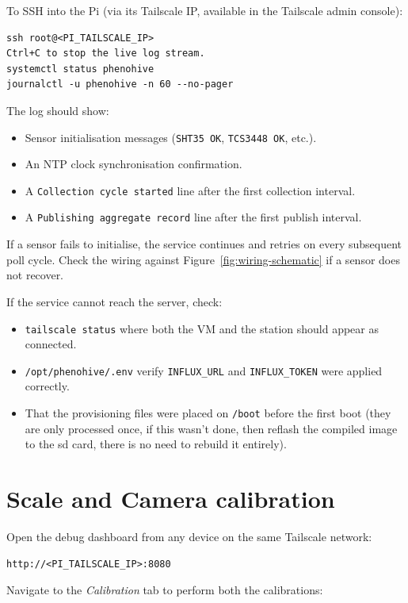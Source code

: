 To SSH into the Pi (via its Tailscale IP, available in the Tailscale admin console):

\begin{verbatim}
ssh root@<PI_TAILSCALE_IP>
Ctrl+C to stop the live log stream.
systemctl status phenohive
journalctl -u phenohive -n 60 --no-pager
\end{verbatim}

The log should show:
\begin{itemize}
    \item Sensor initialisation messages (\texttt{SHT35 OK}, \texttt{TCS3448 OK}, etc.).
    \item An NTP clock synchronisation confirmation.
    \item A \texttt{Collection cycle started} line after the first collection interval.
    \item A \texttt{Publishing aggregate record} line after the first publish interval.
\end{itemize}

If a sensor fails to initialise, the service continues and retries on every subsequent poll cycle. Check the wiring against Figure~\ref{fig:wiring-schematic} if a sensor does not recover.

If the service cannot reach the server, check:
\begin{itemize}
    \item \texttt{tailscale status} where both the VM and the station should appear as connected.
    \item \texttt{/opt/phenohive/.env} verify \texttt{INFLUX\_URL} and \texttt{INFLUX\_TOKEN} were applied correctly.
    \item That the provisioning files were placed on \texttt{/boot} before the first boot (they are only processed once, if this wasn't done, then reflash the compiled image to the sd card, there is no need to rebuild it entirely).
\end{itemize}

\section{Scale and Camera calibration}

Open the debug dashboard from any device on the same Tailscale network:

\begin{verbatim}
http://<PI_TAILSCALE_IP>:8080
\end{verbatim}

Navigate to the \emph{Calibration} tab to perform both the calibrations:

